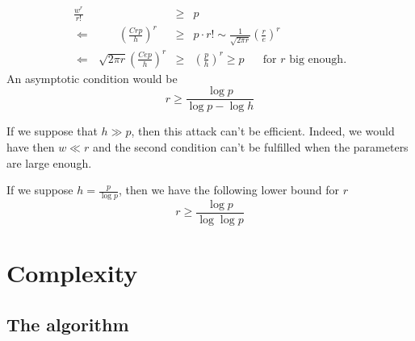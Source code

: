 \documentclass[a4paper]{article}
\begin{document}


\begin{eqnarray*}
\frac{w^r}{r!} &\geq& p \\
\Leftarrow \ \ \ \ \ \ \ \ \ \ \ \left(\frac{Crp}{h}\right)^r  &\geq& p \cdot r! \sim \frac{1}{\sqrt{2\pi r}} \left(\frac{r}{e}\right)^r \\
\Leftarrow \ \ \ \sqrt{2\pi r} \left(\frac{Cep}{h}\right)^r &\geq& \left(\frac{p}{h}\right)^r \geq p \ \ \ \ \ \ \text{ for $r$ big enough.}
\end{eqnarray*}
An asymptotic condition would be
$$ r \geq \frac{\log p}{\log p - \log h}$$

If we suppose that $h \gg p$, then this attack can't be efficient. Indeed, we would have then $w \ll r$ and the second condition can't be fulfilled when the parameters are large enough.

If we suppose $h = \frac{p}{\log p}$, then we have the following lower bound for $r$
$$ r \geq \frac{\log p}{\log \log p}$$



\section{Complexity}

\subsection{The algorithm}
\end{document}
